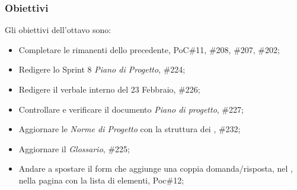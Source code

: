 \subsubsection{Obiettivi}
\label{sec:sprint8_obiettivi}
Gli obiettivi dell'ottavo  sono:
\begin{itemize}
    \item Completare le  rimanenti dello  precedente,  PoC\#11, \#208, \#207, \#202;
    \item Redigere lo Sprint 8 \textit{Piano di Progetto},  \#224;
    \item Redigere il verbale interno del 23 Febbraio,  \#226;
    \item Controllare e verificare il documento \textit{Piano di progetto},  \#227;
        \item Aggiornare le \textit{Norme di Progetto} con la struttura dei ,  \#232;
    \item Aggiornare il \textit{Glossario},  \#225;
    \item Andare a spostare il form che aggiunge una coppia domanda/risposta, nel , nella pagina con la lista di elementi,  Poc\#12;
\end{itemize}